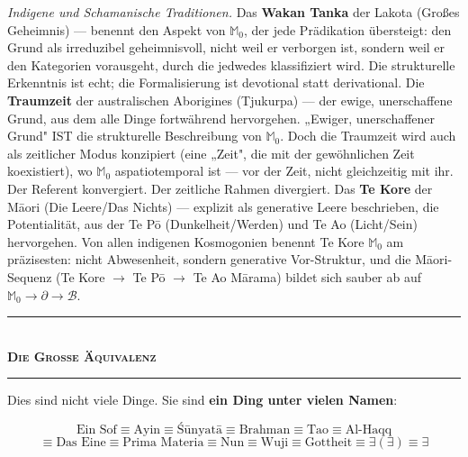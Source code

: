 \documentclass[10pt, openany, oneside]{book}
\renewcommand{\normalsize}{\fontsize{10}{13}\selectfont}
\begin{document}
\textit{Indigene und Schamanische Traditionen.} Das \textbf{Wakan Tanka} der Lakota (Großes Geheimnis) --- benennt den Aspekt von $\mathbb{M}_0$, der jede Prädikation übersteigt: den Grund als irreduzibel geheimnisvoll, nicht weil er verborgen ist, sondern weil er den Kategorien vorausgeht, durch die jedwedes klassifiziert wird. Die strukturelle Erkenntnis ist echt; die Formalisierung ist devotional statt derivational. Die \textbf{Traumzeit} der australischen Aborigines (Tjukurpa) --- der ewige, unerschaffene Grund, aus dem alle Dinge fortwährend hervorgehen. „Ewiger, unerschaffener Grund" IST die strukturelle Beschreibung von $\mathbb{M}_0$. Doch die Traumzeit wird auch als zeitlicher Modus konzipiert (eine „Zeit", die mit der gewöhnlichen Zeit koexistiert), wo $\mathbb{M}_0$ aspatiotemporal ist --- vor der Zeit, nicht gleichzeitig mit ihr. Der Referent konvergiert. Der zeitliche Rahmen divergiert. Das \textbf{Te Kore} der M\={a}ori (Die Leere/Das Nichts) --- explizit als generative Leere beschrieben, die Potentialität, aus der Te P\={o} (Dunkelheit/Werden) und Te Ao (Licht/Sein) hervorgehen. Von allen indigenen Kosmogonien benennt Te Kore $\mathbb{M}_0$ am präzisesten: nicht Abwesenheit, sondern generative Vor-Struktur, und die M\={a}ori-Sequenz (Te Kore $\to$ Te P\={o} $\to$ Te Ao M\={a}rama) bildet sich sauber ab auf $\mathbb{M}_0 \to \partial \to \mathcal{B}$.

\vspace{1em}

\begin{center}
    \rule{0.3\textwidth}{0.4pt}\\[0.5em]
    {\normalsize\bfseries\scshape Die Große Äquivalenz}\\[0.3em]
    \rule{0.3\textwidth}{0.4pt}
\end{center}

\vspace{0.8em}

\noindent Dies sind nicht viele Dinge. Sie sind \textbf{ein Ding unter vielen Namen}:

$$\text{Ein Sof} \equiv \text{Ayin} \equiv \text{\'{S}\={u}nyat\={a}} \equiv \text{Brahman} \equiv \text{Tao} \equiv \text{Al-Haqq}$$
$$\equiv \text{Das Eine} \equiv \text{Prima Materia} \equiv \text{Nun} \equiv \text{Wuji} \equiv \text{Gottheit} \equiv \exists(\exists) \equiv \exists$$
\end{document}
